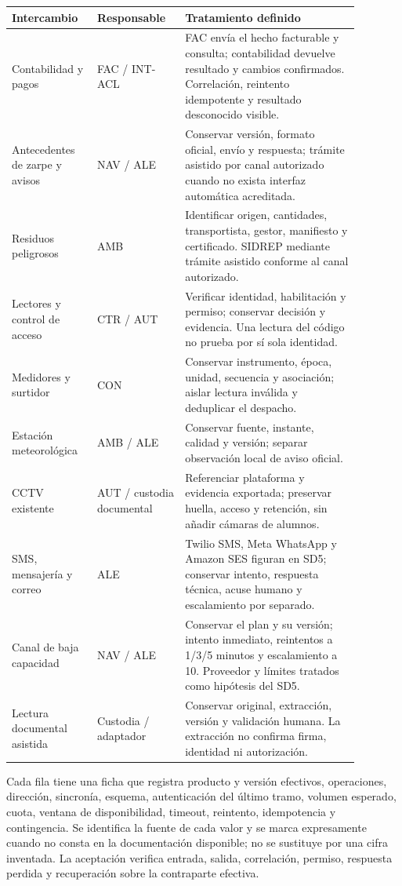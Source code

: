 \begingroup\small
\begin{longtable}{@{}p{0.21\linewidth}p{0.22\linewidth}p{0.45\linewidth}@{}}
\textbf{Intercambio} & \textbf{Responsable} & \textbf{Tratamiento definido} \\
\hline
Contabilidad y pagos & FAC / INT-ACL & FAC envía el hecho facturable y consulta; contabilidad devuelve resultado y cambios confirmados. Correlación, reintento idempotente y resultado desconocido visible. \\
Antecedentes de zarpe y avisos & NAV / ALE & Conservar versión, formato oficial, envío y respuesta; trámite asistido por canal autorizado cuando no exista interfaz automática acreditada. \\
Residuos peligrosos & AMB & Identificar origen, cantidades, transportista, gestor, manifiesto y certificado. SIDREP mediante trámite asistido conforme al canal autorizado. \\
Lectores y control de acceso & CTR / AUT & Verificar identidad, habilitación y permiso; conservar decisión y evidencia. Una lectura del código no prueba por sí sola identidad. \\
Medidores y surtidor & CON & Conservar instrumento, época, unidad, secuencia y asociación; aislar lectura inválida y deduplicar el despacho. \\
Estación meteorológica & AMB / ALE & Conservar fuente, instante, calidad y versión; separar observación local de aviso oficial. \\
CCTV existente & AUT / custodia documental & Referenciar plataforma y evidencia exportada; preservar huella, acceso y retención, sin añadir cámaras de alumnos. \\
SMS, mensajería y correo & ALE & Twilio SMS, Meta WhatsApp y Amazon SES figuran en SD5; conservar intento, respuesta técnica, acuse humano y escalamiento por separado. \\
Canal de baja capacidad & NAV / ALE & Conservar el plan y su versión; intento inmediato, reintentos a 1/3/5 minutos y escalamiento a 10. Proveedor y límites tratados como hipótesis del SD5. \\
Lectura documental asistida & Custodia / adaptador & Conservar original, extracción, versión y validación humana. La extracción no confirma firma, identidad ni autorización. \\
\end{longtable}
\endgroup

Cada fila tiene una ficha que registra producto y versión efectivos, operaciones, dirección, sincronía, esquema, autenticación del último tramo, volumen esperado, cuota, ventana de disponibilidad, timeout, reintento, idempotencia y contingencia. Se identifica la fuente de cada valor y se marca expresamente cuando no consta en la documentación disponible; no se sustituye por una cifra inventada. La aceptación verifica entrada, salida, correlación, permiso, respuesta perdida y recuperación sobre la contraparte efectiva.

